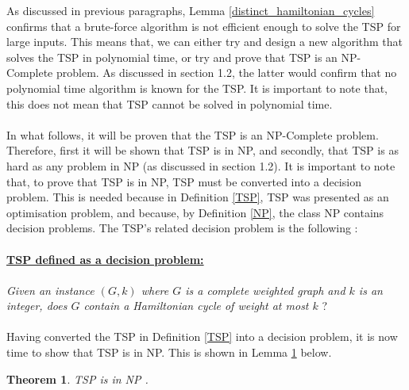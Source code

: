 \documentclass{article}
\newtheorem{theorem}[definition]{Theorem}
\begin{document}
As discussed in previous paragraphs, Lemma \ref{distinct_hamiltonian_cycles} confirms that a brute-force algorithm is not efficient enough to solve the TSP for large inputs. This means that, we can either try and design a new algorithm that solves the TSP in polynomial time, or try and prove that TSP is an NP-Complete problem. As discussed in section 1.2, the latter would confirm that no polynomial time algorithm is known for the TSP. It is important to note that, this does not mean that TSP cannot be solved in polynomial time.\\\\ In what follows, it will be proven that the TSP is an NP-Complete problem. Therefore, first it will be shown that TSP is in NP, and secondly, that TSP is as hard as any problem in NP (as discussed in section 1.2). It is important to note that, to prove that TSP is in NP, TSP must be converted into a decision problem. This is needed because in Definition \ref{TSP}, TSP was presented as an optimisation problem, and because, by Definition \ref{NP}, the class NP contains decision problems. The TSP's related decision problem is the following :\\\\
\underline{\textbf{TSP defined as a decision problem:}}\\\\
\textit{Given an instance $(G,k)$ where $G$ is a complete weighted graph and $k$ is an integer, does $G$ contain a Hamiltonian cycle of weight at most $k$} \cite{cormen_leiserson_rivest_stein}?\\\\
Having converted the TSP in Definition \ref{TSP} into a decision problem, it is now time to show that TSP is in NP. This is shown in Lemma \ref{TSP_in_NP} below.
\begin{theorem}
\label{TSP_in_NP}
TSP is in NP {}.
\end{theorem}
\end{document}
